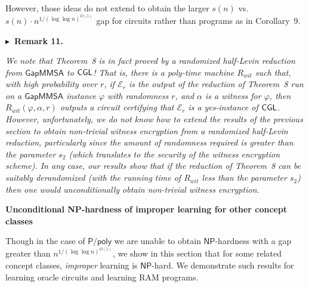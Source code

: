 \documentclass[10pt,a4paper]{article}
\begin{document}



However, those ideas do not extend to obtain the larger $s(n)$ vs. $s(n)\cdot n^{1/(\log\log n)^{O(1)}}$ gap for circuits rather than programs as in Corollary 9.\par





\par\medskip\noindent\textbf{
$\blacktriangleright$ Remark 11.
}\par



\emph{We note that Theorem 8 is in fact proved by a randomized half-Levin reduction from ${\mathsf{Gap}}{\mathsf{MMSA}}$ to ${\sf CGL}$! That is, there is a poly-time machine $R_{wit}$ such that, with high probability over $r$, if $\mathcal{E}_{r}$ is the output of the reduction of Theorem 8 run on a ${\mathsf{Gap}}{\mathsf{MMSA}}$ instance $\varphi$ with randomness $r$, and $\alpha$ is a witness for $\varphi$, then $R_{wit}(\varphi,\alpha,r)$ outputs a circuit certifying that $\mathcal{E}_{r}$ is a yes-instance of ${\sf CGL}$. However, unfortunately, we do not know how to extend the results of the previous section to obtain non-trivial witness encryption from a randomized half-Levin reduction, particularly since the amount of randomness required is greater than the parameter $s_{2}$ (which translates to the security of the witness encryption scheme). In any case, our results show that if the reduction of Theorem 8 can be suitably derandomized (with the running time of $R_{wit}$ less than the parameter $s_{2}$) then one would unconditionally obtain non-trivial witness encryption.}\par







\par\medskip\noindent\textbf{Unconditional NP-hardness of improper learning for other concept classes}\par




Though in the case of ${\mathsf{P}}/{\mathsf{poly}}$ we are unable to obtain ${\mathsf{NP}}$-hardness with a gap greater than $n^{1/(\log\log n)^{O(1)}}$, we show in this section that for some related concept classes, \emph{improper} learning is ${\mathsf{NP}}$-hard. We demonstrate such results for learning oracle circuits and learning RAM programs.\par
\end{document}

